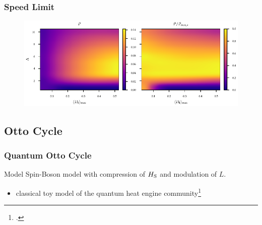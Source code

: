 \documentclass[10pt, aspectratio=169]{beamer}
\begin{document}
\begin{frame}
  \frametitle{Speed Limit}
  \begin{figure}[h]
    \centering
    \includegraphics[height=.65\textheight]{figs/modcoup/power_en_heatmap}
  \end{figure}
\end{frame}


\subsection{Otto Cycle}
\begin{frame}
  \frametitle{Quantum Otto Cycle}
  \begin{figure}
    \centering
    
  \end{figure}
  \begin{block}{Model}
    Spin-Boson model with compression of \(H_{\mathrm{S}}\) and modulation
    of \(L\).
  \end{block}
  \begin{itemize}
  \item classical toy model of the quantum heat engine community\footcite{Geva1992Feb}
  \end{itemize}
\end{frame}
\end{document}
